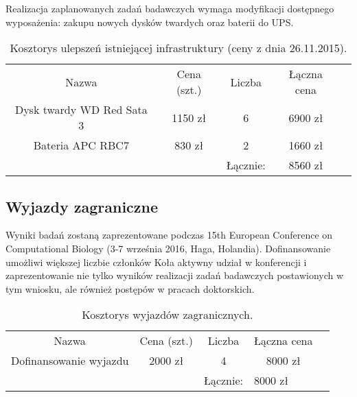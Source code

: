 \documentclass{article}
\begin{document}
Realizacja zaplanowanych zadań badawczych wymaga modyfikacji dostępnego wyposażenia: zakupu nowych dysków twardych oraz baterii do UPS.

\begin{table}[!htbp]
\centering
\caption*{Kosztorys ulepszeń istniejącej infrastruktury (ceny z dnia 26.11.2015).}
\begin{tabular}{ccccc}
\cline{1-4}
\multicolumn{1}{|c|}{Nazwa}                     & \multicolumn{1}{c|}{Cena (szt.)} & \multicolumn{1}{c|}{Liczba} & \multicolumn{1}{c|}{Łączna cena} &  \\ \cline{1-4}
\multicolumn{1}{|c|}{Dysk twardy WD Red Sata 3} & \multicolumn{1}{c|}{1150 zł}     & \multicolumn{1}{c|}{6}      & \multicolumn{1}{c|}{6900 zł}     &  \\ \cline{1-4}
\multicolumn{1}{|c|}{Bateria APC RBC7}          & \multicolumn{1}{c|}{830 zł}      & \multicolumn{1}{c|}{2}      & \multicolumn{1}{c|}{1660 zł}     &  \\ \cline{1-4}
                                                &                                  & Łącznie:                    & 8560 zł                          & 
\end{tabular}
\end{table}

\subsection{Wyjazdy zagraniczne}

Wyniki badań zostaną zaprezentowane podczas 15th European Conference on Computational Biology (3-7 września 2016, Haga, Holandia). Dofinansowanie umożliwi większej liczbie członków Koła aktywny udział w konferencji i zaprezentowanie nie tylko wyników realizacji zadań badawczych postawionych w tym wniosku, ale również postępów w pracach doktorskich.

\begin{table}[!htbp]
\centering
\caption*{Kosztorys wyjazdów zagranicznych.}
\begin{tabular}{lllll}
\cline{1-4}
\multicolumn{1}{|c|}{Nazwa}                     & \multicolumn{1}{c|}{Cena (szt.)} & \multicolumn{1}{c|}{Liczba} & \multicolumn{1}{c|}{Łączna cena} &  \\ \cline{1-4}
\multicolumn{1}{|c|}{Dofinansowanie wyjazdu} & \multicolumn{1}{c|}{2000 zł}     & \multicolumn{1}{c|}{4}      & \multicolumn{1}{c|}{8000 zł}     &  \\ \cline{1-4}
                                                &                                  & Łącznie:                    & 8000 zł                          & 
\end{tabular}
\end{table}
\end{document}
